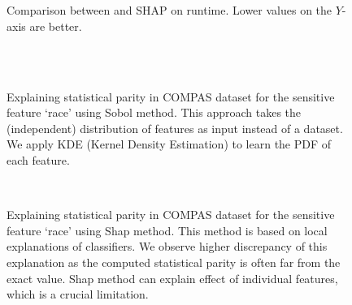 \begin{comment}
TODO
\begin{itemize}
	\item all group fairness metrics
	\item vary sample size  and dimension of features (add statistics for each dataset in the figure)
	\item runtime vs max-order $ \lambda $
	\item draw $ 1/n $, $ 1/n^{1/2} $, $ 1/n^{1/3} $, std.
	\item \red{Experiment of fairness enhancing and attack algo on the same dataset.} 
\end{itemize}
\end{comment}





\clearpage


\begin{figure}
	\centering
	\\
	\\
	\caption{Comparison between {\framework} and SHAP on runtime. Lower values on the $ Y $-axis are better. }
\end{figure}





\begin{figure}
	\centering
	\\
	\\
	\caption{Explaining statistical parity in COMPAS dataset for the sensitive feature `race' using Sobol method. This approach takes the (independent) distribution of features as input instead of a dataset. We apply KDE (Kernel Density Estimation) to learn the PDF of each feature.}
\end{figure}


\begin{figure}
	\centering
	\\
	\caption{Explaining statistical parity in COMPAS dataset for the sensitive feature `race' using Shap method. This method is based on local explanations of classifiers. We observe higher discrepancy of this explanation as the computed statistical parity is often far from the exact value. Shap method can explain effect of individual features, which is a crucial limitation.}
\end{figure}

